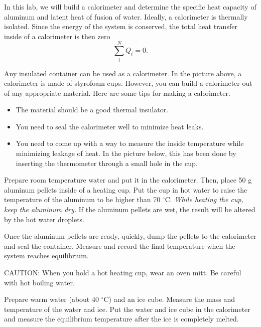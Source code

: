In this lab, we will build a calorimeter and determine the specific
heat capacity of aluminum and latent heat of fusion of water. Ideally,
a calorimeter is thermally isolated. Since the energy of the system is
conserved, the total heat transfer inside of a calorimeter is then zero
\begin{equation*}
\sum_i^N Q_i = 0.
\end{equation*}




\observations 

Any insulated container can be used as a calorimeter. In the picture
above, a calorimeter is made of styrofoam cups.  However, you can
build a calorimeter out of any appropriate material. Here are some tips for making a
calorimeter.

\begin{itemize}
\item The material should be a good thermal insulator.
\item You need to seal the calorimeter well to minimize heat leaks. 
\item You need to come up with a way to measure the inside temperature while minimizing leakage of heat.
In the picture below, this has been done by inserting the thermometer through a small hole in the cup.
\end{itemize}



Prepare room temperature water and put it in the calorimeter. Then, place 50 g aluminum pellets inside of a heating cup. Put the cup in hot water to raise the temperature of the aluminum to be higher than 70 $^\circ$C. \textit{While heating the cup, keep the aluminum dry.} If the aluminum pellets are wet, the result will be altered by the hot water droplets. 

Once the aluminum pellets are ready, quickly, dump the pellets to the calorimeter and seal the container. Measure and record the final temperature when the system reaches equilibrium. 

CAUTION: When you hold a hot heating cup, wear an oven mitt. Be careful with hot boiling water. 

Prepare warm water (about 40 $^\circ$C) and an ice cube. Measure the mass and temperature of the water and ice. Put the water and ice cube in the calorimeter and measure the equilibrium temperature after the ice is completely melted.  

